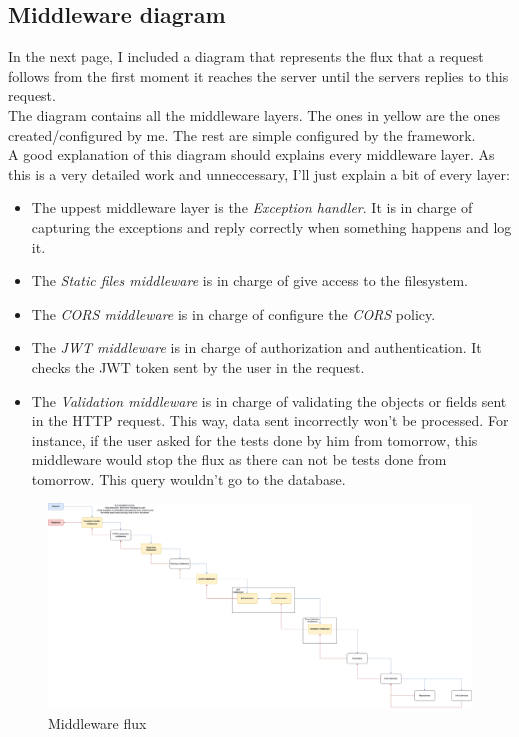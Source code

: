     \subsection{Middleware diagram}
    In the next page, I included a diagram that represents the flux that a request follows from the first moment it reaches the server until the servers replies to this request. \\

    The diagram contains all the middleware layers. The ones in yellow are the ones created/configured by me. The rest are simple configured by the framework. \\

    A good explanation of this diagram should explains every middleware layer. As this is a very detailed work and unneccessary, I'll just explain a bit of every layer:
    \begin{itemize}[noitemsep]
        \item The uppest middleware layer is the \textit{Exception handler}. It is in charge of capturing the exceptions and reply correctly when something happens and log it.
        \item The \textit{Static files middleware} is in charge of give access to the filesystem. \\
        \item The \textit{CORS middleware} is in charge of configure the \textit{CORS} policy. \\
        \item The \textit{JWT middleware} is in charge of authorization and authentication. It checks the {JWT token} sent by the user in the request. 
        \item The \textit{Validation middleware} is in charge of validating the objects or fields sent in the {HTTP request}. This way, data sent incorrectly won't be processed. For instance, if the user asked for the tests done by him from tomorrow, this middleware would stop the flux as there can not be tests done from tomorrow. This query wouldn't go to the database. 
    \end{itemize}
        \newpage
        \begin{figure}[H]
            \centering
                \includegraphics[angle=90, width=\textwidth, height=\textheight]{assets/diagrams/middleware.png}
            \caption{Middleware flux}
            \label{fig:implementation_middleware}
        \end{figure}

